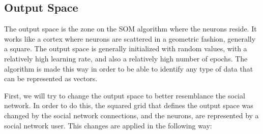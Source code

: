 \subsection{Output Space}
\label{sub:output_space}
The output space is the zone on the \ac{SOM} algorithm where the neurons reside. It works like a cortex where neurons are scattered in a geometric fashion, generally a square. The output space is generally initialized with random values, with a relatively high learning rate, and also a relatively high number of epochs. The algorithm is made this way in order to be able to identify any type of data that can be represented as vectors.

First, we will try to change the output space to better resemblance the social network. In order to do this, the squared grid that defines the output space was changed by the social network connections, and the neurons, are represented by a social network user. This changes are applied in the following way:
